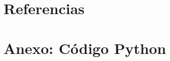 \documentclass[aps,prl,preprint,superscriptaddress]{revtex4-1}
\begin{document}
    
    

    \maketitle

    

    \newpage
    

    \newpage
    

    \newpage
    

    \newpage
    \section{Referencias}

    \nocite{*}
    
    

    \newpage
    \appendix
    
    \section{Anexo: Código Python}
    

    \newpage
    
\end{document}
